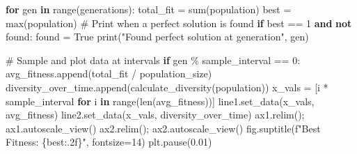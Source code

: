 \documentclass[
  letterpaper,
  DIV=11,
  numbers=noendperiod]{scrreprt}
\newenvironment{Shaded}{\begin{snugshade}}{\end{snugshade}}
\newcommand{\BuiltInTok}[1]{\textcolor[rgb]{0.00,0.23,0.31}{#1}}
\newcommand{\CommentTok}[1]{\textcolor[rgb]{0.37,0.37,0.37}{#1}}
\newcommand{\ControlFlowTok}[1]{\textcolor[rgb]{0.00,0.23,0.31}{\textbf{#1}}}
\newcommand{\DecValTok}[1]{\textcolor[rgb]{0.68,0.00,0.00}{#1}}
\newcommand{\FloatTok}[1]{\textcolor[rgb]{0.68,0.00,0.00}{#1}}
\newcommand{\KeywordTok}[1]{\textcolor[rgb]{0.00,0.23,0.31}{\textbf{#1}}}
\newcommand{\NormalTok}[1]{\textcolor[rgb]{0.00,0.23,0.31}{#1}}
\newcommand{\OperatorTok}[1]{\textcolor[rgb]{0.37,0.37,0.37}{#1}}
\newcommand{\SpecialCharTok}[1]{\textcolor[rgb]{0.37,0.37,0.37}{#1}}
\newcommand{\SpecialStringTok}[1]{\textcolor[rgb]{0.13,0.47,0.30}{#1}}
\newcommand{\StringTok}[1]{\textcolor[rgb]{0.13,0.47,0.30}{#1}}
\newcommand{\VariableTok}[1]{\textcolor[rgb]{0.07,0.07,0.07}{#1}}
\theoremstyle{definition}
\theoremstyle{remark}
\begin{document}
\begin{tcolorbox}
\begin{Shaded}
\begin{Highlighting}[]
\ControlFlowTok{for}\NormalTok{ gen }\KeywordTok{in} \BuiltInTok{range}\NormalTok{(generations):}
\NormalTok{    total\_fit }\OperatorTok{=} \BuiltInTok{sum}\NormalTok{(population)}
\NormalTok{    best }\OperatorTok{=} \BuiltInTok{max}\NormalTok{(population)}
    \CommentTok{\# Print when a perfect solution is found}
    \ControlFlowTok{if}\NormalTok{ best }\OperatorTok{==} \DecValTok{1} \KeywordTok{and} \KeywordTok{not}\NormalTok{ found:}
\NormalTok{        found }\OperatorTok{=} \VariableTok{True}
        \BuiltInTok{print}\NormalTok{(}\StringTok{"Found perfect solution at generation"}\NormalTok{, gen)}
        
    \CommentTok{\# Sample and plot data at intervals}
    \ControlFlowTok{if}\NormalTok{ gen }\OperatorTok{\%}\NormalTok{ sample\_interval }\OperatorTok{==} \DecValTok{0}\NormalTok{:}
\NormalTok{        avg\_fitness.append(total\_fit }\OperatorTok{/}\NormalTok{ population\_size)}
\NormalTok{        diversity\_over\_time.append(calculate\_diversity(population))}
\NormalTok{        x\_vals }\OperatorTok{=}\NormalTok{ [i }\OperatorTok{*}\NormalTok{ sample\_interval }\ControlFlowTok{for}\NormalTok{ i }\KeywordTok{in} \BuiltInTok{range}\NormalTok{(}\BuiltInTok{len}\NormalTok{(avg\_fitness))]}
\NormalTok{        line1.set\_data(x\_vals, avg\_fitness)}
\NormalTok{        line2.set\_data(x\_vals, diversity\_over\_time)}
\NormalTok{        ax1.relim()}\OperatorTok{;}\NormalTok{ ax1.autoscale\_view()}
\NormalTok{        ax2.relim()}\OperatorTok{;}\NormalTok{ ax2.autoscale\_view()}
\NormalTok{        fig.suptitle(}\SpecialStringTok{f"Best Fitness: }\SpecialCharTok{\{}\NormalTok{best}\SpecialCharTok{:.2f\}}\SpecialStringTok{"}\NormalTok{, fontsize}\OperatorTok{=}\DecValTok{14}\NormalTok{)}
\NormalTok{        plt.pause(}\FloatTok{0.01}\NormalTok{)}
        


\end{Highlighting}
\end{Shaded}
\end{tcolorbox}
\end{document}
